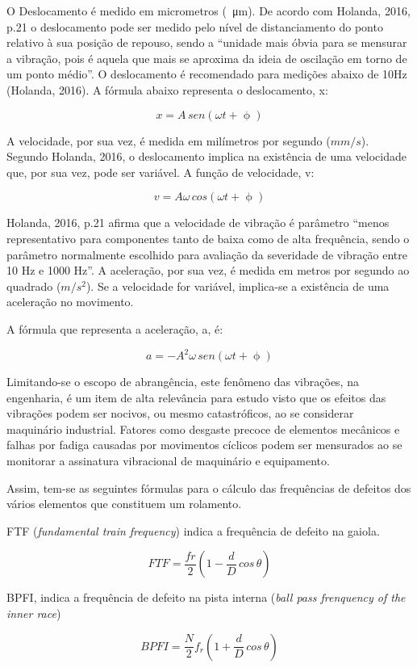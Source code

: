 \documentclass[
	12pt,				
	oneside,			
	a4paper,			
	english,			
	brazil				
	]{abntex2ppgsi}
\begin{document}
O Deslocamento é medido em micrometros (\SI{}{\micro\metre}). De acordo com Holanda, 2016, p.21 o deslocamento pode ser medido pelo nível de distanciamento do ponto relativo à sua posição de repouso, sendo a “unidade mais óbvia para se mensurar a vibração, pois é aquela que mais se aproxima da ideia de oscilação em torno de um ponto médio”. O deslocamento é recomendado para medições abaixo de 10Hz (Holanda, 2016). A fórmula abaixo representa o deslocamento, x:

\[x = A \,sen (\omega t + \upphi)\]

A velocidade, por sua vez, é medida em milímetros por segundo ($mm/s$). Segundo Holanda, 2016, o deslocamento implica na existência de uma velocidade que, por sua vez, pode ser variável. A função de velocidade, v:

\[v = A\omega \,cos (\omega t + \upphi)\]

Holanda, 2016, p.21 afirma que a velocidade de vibração é parâmetro “menos representativo para componentes tanto de baixa como de alta frequência, sendo o parâmetro normalmente escolhido para avaliação da severidade de vibração entre 10 Hz e 1000 Hz”.
A aceleração, por sua vez, é medida em metros por segundo ao quadrado ($m/s^{2}$). Se a velocidade for variável, implica-se a existência de uma aceleração no movimento. 

A fórmula que representa a aceleração, a, é:

\[a = -A^{2} \omega \,sen (\omega t + \upphi)\]

Limitando-se o escopo de abrangência, este fenômeno das vibrações, na engenharia, é um item de alta relevância para estudo visto que os efeitos das vibrações podem ser nocivos, ou mesmo catastróficos, ao se considerar maquinário industrial. Fatores como desgaste precoce de elementos mecânicos e falhas por fadiga causadas por movimentos cíclicos podem ser mensurados ao se monitorar a assinatura vibracional de maquinário e equipamento. 

Assim, tem-se as seguintes fórmulas para o cálculo das frequências de defeitos dos vários  elementos que constituem um rolamento. 

FTF (\textit{fundamental train frequency}) indica a frequência de defeito na gaiola. 

\[FTF = \frac{fr}{2} \left ( 1 - \frac{d}{D} \,cos \, \theta \right )  \]

BPFI, indica a frequência de defeito na pista interna (\textit{ball pass frenquency of the inner race})

\[BPFI = \frac{N}{2}f_{r} \left ( 1 + \frac{d}{D} \,cos \, \theta \right )  \]
\end{document}

